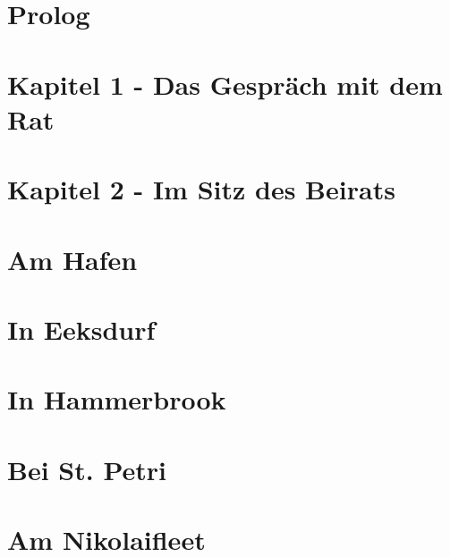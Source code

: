 
\section{\textbf{Prolog}}


\section{\textbf{Kapitel 1 - Das Gespräch mit dem Rat}}


\section{\textbf{Kapitel 2 - Im Sitz des Beirats}}


\section{\textbf{Am Hafen}}
\label{Hafen}

\newpage

\section{\textbf{In Eeksdurf}}
\label{xd}

\newpage

\section{\textbf{In Hammerbrook}}
\label{arm}

\newpage

\section{\textbf{Bei St. Petri}}
\label{Petri}

\newpage

\section{\textbf{Am Nikolaifleet}}
\label{Fleet}

